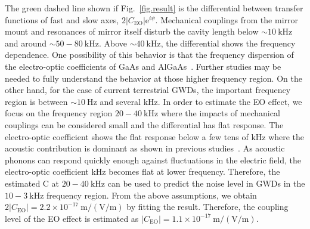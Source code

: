 \documentclass[%
 reprint,
 superscriptaddress,
 amsmath,amssymb,
 aps,
]{revtex4-2}
\newcommand{\unit}[1]{\ \mathrm{#1}}
\begin{document}
The green dashed line shown if Fig.~\ref{fig.result} is the differential between transfer functions of fast and slow axes, $2|C_{\mathrm{EO}}|\mathrm{e}^{i\psi}$.
Mechanical couplings from the mirror mount and resonances of mirror itself disturb the cavity length below $\sim10{\unit{kHz}}$ and around $\sim50 - 80\unit{kHz}$.
Above $\sim40\unit{kHz}$, the differential shows the frequency dependence.
One possibility of this behavior is that the frequency dispersion of the electro-optic coefficients of GaAs and AlGaAs~\cite{Abarkan2003}.
Further studies may be needed to fully understand the behavior at those higher frequency region.
On the other hand, for the case of current terrestrial GWDs, the important frequency region is between $\sim10\unit{Hz}$ and several kHz.
In order to estimate the EO effect, we focus on the frequency region $20-40\unit{kHz}$ where the impacts of mechanical couplings can be considered small and the differential has flat response.
The electro-optic coefficient shows the flat response below a few tens of kHz where the acoustic contribution is dominant as shown in previous studies~\cite{Spreiter1997,Bosshard2002}.
As acoustic phonons can respond quickly enough against fluctuations in the electric field, the electro-optic coefficient kHz becomes flat at lower frequency.
Therefore, the estimated C at $20-40\unit{kHz}$ can be used to predict the noise level in GWDs in the $10 - 3\unit{kHz}$ frequency region. 
From the above assumptions, we obtain $2|C_{\mathrm{EO}}|= 2.2\times10^{-17}\unit{m/(V/m)}$ by fitting the result.
Therefore, the coupling level of the EO effect is estimated as $|C_{\mathrm{EO}}|=1.1\times10^{-17}\unit{m/(V/m)}$.

\end{document}
